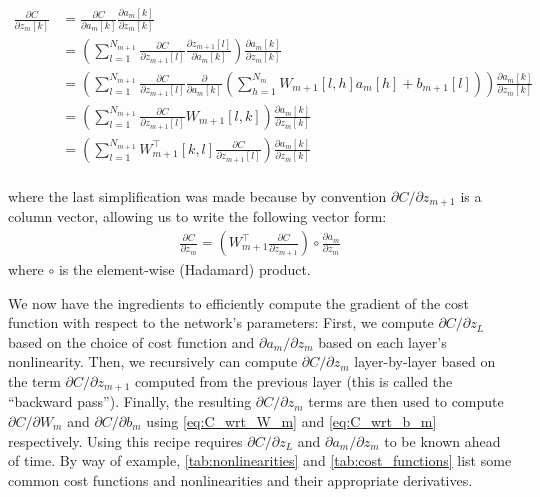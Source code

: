 \begin{align}
        \frac{\partial C}{\partial z_m[k]} &= \frac{\partial C}{\partial a_m[k]} \frac{\partial a_m[k]}{\partial z_m[k]}\\
                                           &= \left(\sum_{l = 1}^{N_{m + 1}}\frac{\partial C}{\partial z_{m + 1}[l]}\frac{\partial z_{m + 1}[l]}{\partial a_m[k]}\right)\frac{\partial a_m[k]}{\partial z_m[k]}\\
                                           &= \left(\sum_{l = 1}^{N_{m + 1}}\frac{\partial C}{\partial z_{m + 1}[l]}\frac{\partial}{\partial a_m[k]} \left(\sum_{h = 1}^{N_m} W_{m + 1}[l, h] a_m[h] + b_{m + 1}[l]\right)\right) \frac{\partial a_m[k]}{\partial z_m[k]}\\
                                           &= \left(\sum_{l = 1}^{N_{m + 1}}\frac{\partial C}{\partial z_{m + 1}[l]} W_{m + 1}[l, k]\right) \frac{\partial a_m[k]}{\partial z_m[k]}\\
                                           &= \left(\sum_{l = 1}^{N_{m + 1}}W_{m + 1}^\top[k, l] \frac{\partial C}{\partial z_{m + 1}[l]}\right) \frac{\partial a_m[k]}{\partial z_m[k]}\\
\end{align}

where the last simplification was made because by convention $\partial C/\partial z_{m + 1}$ is a column vector, allowing us to write the following vector form:
\begin{align}
\frac{\partial C}{\partial z_m} = \left(W_{m + 1}^\top \frac{\partial C}{\partial z_{m + 1}}\right) \circ \frac{\partial a_m}{\partial z_m}
\end{align}
where $\circ$ is the element-wise (Hadamard) product.

We now have the ingredients to efficiently compute the gradient of the cost function with respect to the network's parameters: First, we compute $\partial C/\partial z_L$ based on the choice of cost function and $\partial a_m/\partial z_m$ based on each layer's nonlinearity.
Then, we recursively can compute $\partial C/\partial z_m$ layer-by-layer based on the term $\partial C/\partial z_{m + 1}$ computed from the previous layer (this is called the ``backward pass'').
Finally, the resulting $\partial C/\partial z_m$ terms are then used to compute $\partial C/\partial W_m$ and $\partial C/\partial b_m$ using \cref{eq:C_wrt_W_m} and \cref{eq:C_wrt_b_m} respectively.
Using this recipe requires $\partial C/\partial z_L$ and $\partial a_m/\partial z_m$ to be known ahead of time.
By way of example, \cref{tab:nonlinearities} and \cref{tab:cost_functions} list some common cost functions and nonlinearities and their appropriate derivatives.

